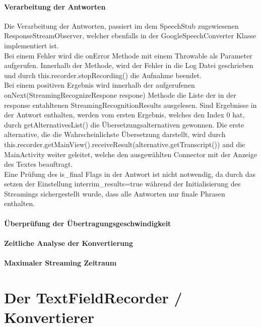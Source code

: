 \paragraph{Verarbeitung der Antworten}
Die Verarbeitung der Antworten, passiert im dem SpeechStub zugewiesenen ResponseStreamObserver, welcher ebenfalls in der GoogleSpeechConverter Klasse implementiert ist.\\
Bei einem Fehler wird die onError Methode mit einem Throwable als Parameter aufgerufen. Innerhalb der Methode, wird der Fehler in die Log Datei geschrieben und durch this.recorder.stopRecording() die Aufnahme beendet.\\
Bei einem positiven Ergebnis wird innerhalb der aufgerufenen onNext(StreamingRecognizeRespone respone) Methode die Liste der in der response entahltenen StreamingRecognitionResults ausgelesen. Sind Ergebnisse in der Antwort enthalten, werden vom ersten Ergebnis, welches den Index 0 hat, durch getAlternativesList() die Übersetzungsalternativen gewonnen. Die erste alternative, die die Wahrscheinlichste Übersetzung darstellt, wird durch this.recorder.getMainView().receiveResult(alternative.getTranscript()) and die MainActivity weiter geleitet, welche den ausgewählten Connector mit der Anzeige des Textes beauftragt.\\
Eine Prüfung des is\_final Flags in der Antwort ist nicht notwendig, da durch das setzen der Einstellung interrim\_results=true während der Initialisierung des Streamings sichergestellt wurde, dass alle Antworten nur finale Phrasen enthalten.


\paragraph{Überprüfung der Übertragungsgeschwindigkeit}

\paragraph{Zeitliche Analyse der Konvertierung}
\paragraph{Maximaler Streaming Zeitraum}


\section{Der TextFieldRecorder / Konvertierer}